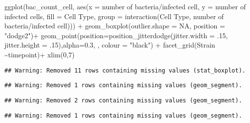 \documentclass[
]{article}
\newenvironment{Shaded}{\begin{snugshade}}{\end{snugshade}}
\newcommand{\AttributeTok}[1]{\textcolor[rgb]{0.77,0.63,0.00}{#1}}
\newcommand{\ConstantTok}[1]{\textcolor[rgb]{0.00,0.00,0.00}{#1}}
\newcommand{\DecValTok}[1]{\textcolor[rgb]{0.00,0.00,0.81}{#1}}
\newcommand{\FloatTok}[1]{\textcolor[rgb]{0.00,0.00,0.81}{#1}}
\newcommand{\FunctionTok}[1]{\textcolor[rgb]{0.00,0.00,0.00}{#1}}
\newcommand{\NormalTok}[1]{#1}
\newcommand{\SpecialCharTok}[1]{\textcolor[rgb]{0.00,0.00,0.00}{#1}}
\newcommand{\StringTok}[1]{\textcolor[rgb]{0.31,0.60,0.02}{#1}}
\begin{document}
\begin{Shaded}
\begin{Highlighting}[]
\FunctionTok{ggplot}\NormalTok{(bac\_count\_cell, }\FunctionTok{aes}\NormalTok{(}\AttributeTok{x =} \StringTok{\textasciigrave{}}\AttributeTok{number of bacteria/infected cell}\StringTok{\textasciigrave{}}\NormalTok{, }\AttributeTok{y =} \StringTok{\textasciigrave{}}\AttributeTok{number of infected cells}\StringTok{\textasciigrave{}}\NormalTok{, }\AttributeTok{fill =} \StringTok{\textasciigrave{}}\AttributeTok{Cell Type}\StringTok{\textasciigrave{}}\NormalTok{,}
                           \AttributeTok{group =}  \FunctionTok{interaction}\NormalTok{(}\StringTok{\textasciigrave{}}\AttributeTok{Cell Type}\StringTok{\textasciigrave{}}\NormalTok{, }\StringTok{\textasciigrave{}}\AttributeTok{number of bacteria/infected cell}\StringTok{\textasciigrave{}}\NormalTok{))) }\SpecialCharTok{+}
  \FunctionTok{geom\_boxplot}\NormalTok{(}\AttributeTok{outlier.shape =} \ConstantTok{NA}\NormalTok{, }\AttributeTok{position =} \StringTok{"dodge2"}\NormalTok{)}\SpecialCharTok{+}
  \FunctionTok{geom\_point}\NormalTok{(}\AttributeTok{position=}\FunctionTok{position\_jitterdodge}\NormalTok{(}\AttributeTok{jitter.width =}\NormalTok{ .}\DecValTok{15}\NormalTok{, }\AttributeTok{jitter.height =}\NormalTok{ .}\DecValTok{15}\NormalTok{),}\AttributeTok{alpha=}\FloatTok{0.3}\NormalTok{, , }\AttributeTok{colour =} \StringTok{"black"}\NormalTok{) }\SpecialCharTok{+}
  \FunctionTok{facet\_grid}\NormalTok{(Strain }\SpecialCharTok{\textasciitilde{}}\NormalTok{timepoint)}\SpecialCharTok{+}
  \FunctionTok{xlim}\NormalTok{(}\DecValTok{0}\NormalTok{,}\DecValTok{7}\NormalTok{)}
\end{Highlighting}
\end{Shaded}

\begin{verbatim}
## Warning: Removed 11 rows containing missing values (stat_boxplot).
\end{verbatim}

\begin{verbatim}
## Warning: Removed 1 rows containing missing values (geom_segment).
\end{verbatim}

\begin{verbatim}
## Warning: Removed 2 rows containing missing values (geom_segment).
\end{verbatim}

\begin{verbatim}
## Warning: Removed 1 rows containing missing values (geom_segment).
\end{verbatim}
\end{document}
